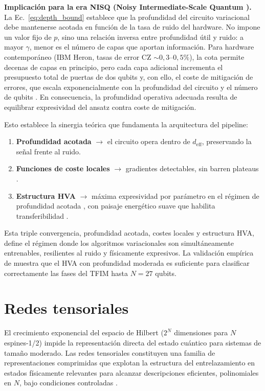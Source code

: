 \documentclass[11pt,a4paper,spanish]{book}
\begin{document}
\textbf{Implicación para la era NISQ (Noisy Intermediate-Scale Quantum \citep{preskill2018}).} La Ec.~\ref{eq:depth_bound} establece que la profundidad del circuito variacional debe mantenerse acotada en función de la tasa de ruido del hardware. No impone un valor fijo de $p$, sino una relación inversa entre profundidad útil y ruido: a mayor $\gamma$, menor es el número de capas que aportan información. Para hardware contemporáneo (IBM Heron, tasas de error CZ $\sim 0,3$--$0,5\%$), la cota permite decenas de capas en principio, pero cada capa adicional incrementa el presupuesto total de puertas de dos qubits y, con ello, el coste de mitigación de errores, que escala exponencialmente con la profundidad del circuito y el número de qubits \citep{tsubouchi2023}. En consecuencia, la profundidad operativa adecuada resulta de equilibrar expresividad del ansatz contra coste de mitigación.

Esto establece la sinergia teórica que fundamenta la arquitectura del pipeline:
\begin{enumerate}
    \item \textbf{Profundidad acotada} $\to$ el circuito opera dentro de $d_{\text{eff}}$, preservando la señal frente al ruido.
    \item \textbf{Funciones de coste locales} $\to$ gradientes detectables, sin barren plateaus \citep{cerezo2021}.
    \item \textbf{Estructura HVA} $\to$ máxima expresividad por parámetro en el régimen de profundidad acotada \citep{wiersema2020}, con paisaje energético suave que habilita transferibilidad \citep{mele2022}.
\end{enumerate}

\noindent Esta triple convergencia, profundidad acotada, costes locales y estructura HVA, define el régimen donde los algoritmos variacionales son simultáneamente entrenables, resilientes al ruido y físicamente expresivos. La validación empírica de \citet{tripathi2026} muestra que el HVA con profundidad moderada es suficiente para clasificar correctamente las fases del TFIM hasta $N = 27$ qubits.


\section{Redes tensoriales}
\label{sec:tensor_networks}

El crecimiento exponencial del espacio de Hilbert ($2^N$ dimensiones para $N$ espines-1/2) impide la representación directa del estado cuántico para sistemas de tamaño moderado. Las redes tensoriales constituyen una familia de representaciones comprimidas que explotan la estructura del entrelazamiento en estados físicamente relevantes para alcanzar descripciones eficientes, polinomiales en $N$, bajo condiciones controladas \citep{schollwock2011}.
\end{document}
